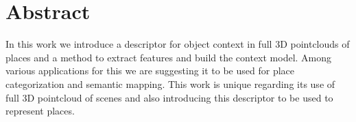 \cleardoublepage
{}
{}
\chapter*{Abstract}

In this work we introduce a descriptor for object context in full 3D pointclouds of places and a method to extract 
features and build the context model.
Among various applications for this we are suggesting it to be used for place categorization and semantic mapping.
This work is unique regarding its use of full 3D pointcloud of scenes and also introducing this descriptor to be used to 
represent places.
